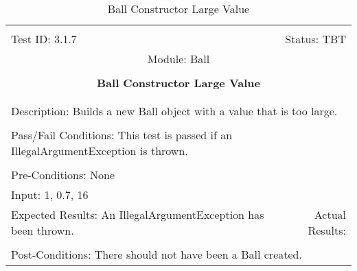 \documentclass[titlepage]{article}
\begin{document}
\begin{center}%
\begin{table}
\begin{tabular}{|l r|}\hline&\\[-2mm]
	Test ID: 3.1.7	&Status: TBT\\[-3mm]
	\multicolumn{2}{|c|}{Module: Ball}\\&\\
	\multicolumn{2}{|c|}{\textbf{\large{Ball Constructor Large Value}}}\\&\\\hline&\\[-3mm]
	\multicolumn{2}{|p{\textwidth}|}{Description: Builds a new Ball object with a value that is too large.}\\[1mm]\hline&\\[-3mm]
	\multicolumn{2}{|p{\textwidth}|}{Pass/Fail Conditions: This test is passed if an IllegalArgumentException is thrown.}\\[1mm]\hline&\\[-3mm]
	\multicolumn{2}{|p{\textwidth}|}{Pre-Conditions: None}\\[4mm]
	\multicolumn{2}{|p{\textwidth}|}{Input: 1, 0.7, 16}\\[2mm]\hline
	\multicolumn{1}{|p{0.49\textwidth}}{Expected Results: An IllegalArgumentException has been thrown.}	&\multicolumn{1}{|p{0.45\textwidth}|}{Actual Results:}\\\hline&\\[-3mm]
	\multicolumn{2}{|p{\textwidth}|}{Post-Conditions: There should not have been a Ball created.}\\\hline
\end{tabular}
\caption{Ball Constructor Large Value}
\end{table}
\end{center}
\end{document}
